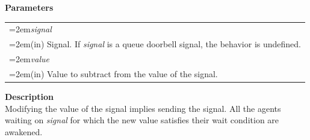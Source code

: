 \documentclass[final]{book}
\newcommand{\hsaarg}[1]{\textit{#1}}
\begin{document}
\noindent\textbf{Parameters}\\[-6mm]
\noindent\begin{longtable}{@{}>{\hangindent=2em}p{\textwidth}}
\hsaarg{signal}\\\hspace{2em}(in) Signal. If \textit{signal} is a queue doorbell signal, the behavior is undefined.\\[2mm]
\hsaarg{value}\\\hspace{2em}(in) Value to subtract from the value of the signal.
\end{longtable}
\vspace{-5mm}\noindent\textbf{Description}\\[1mm]
Modifying the value of the signal implies sending the signal. All the agents waiting on \textit{signal} for which the new value satisfies their wait condition are awakened.
\end{document}
